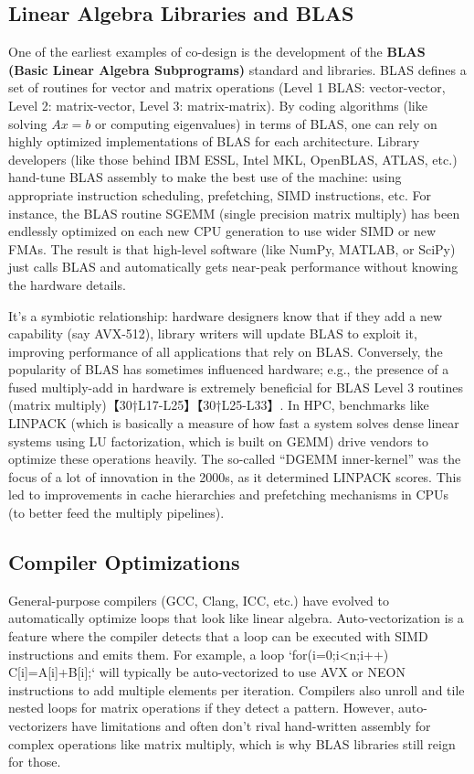 \subsection{Linear Algebra Libraries and BLAS}  
One of the earliest examples of co-design is the development of the \textbf{BLAS (Basic Linear Algebra Subprograms)} standard and libraries. BLAS defines a set of routines for vector and matrix operations (Level 1 BLAS: vector-vector, Level 2: matrix-vector, Level 3: matrix-matrix). By coding algorithms (like solving $Ax=b$ or computing eigenvalues) in terms of BLAS, one can rely on highly optimized implementations of BLAS for each architecture. Library developers (like those behind IBM ESSL, Intel MKL, OpenBLAS, ATLAS, etc.) hand-tune BLAS assembly to make the best use of the machine: using appropriate instruction scheduling, prefetching, SIMD instructions, etc. For instance, the BLAS routine SGEMM (single precision matrix multiply) has been endlessly optimized on each new CPU generation to use wider SIMD or new FMAs. The result is that high-level software (like NumPy, MATLAB, or SciPy) just calls BLAS and automatically gets near-peak performance without knowing the hardware details.

It’s a symbiotic relationship: hardware designers know that if they add a new capability (say AVX-512), library writers will update BLAS to exploit it, improving performance of all applications that rely on BLAS. Conversely, the popularity of BLAS has sometimes influenced hardware; e.g., the presence of a fused multiply-add in hardware is extremely beneficial for BLAS Level 3 routines (matrix multiply)【30†L17-L25】【30†L25-L33】. In HPC, benchmarks like LINPACK (which is basically a measure of how fast a system solves dense linear systems using LU factorization, which is built on GEMM) drive vendors to optimize these operations heavily. The so-called “DGEMM inner-kernel” was the focus of a lot of innovation in the 2000s, as it determined LINPACK scores. This led to improvements in cache hierarchies and prefetching mechanisms in CPUs (to better feed the multiply pipelines).

\subsection{Compiler Optimizations}  
General-purpose compilers (GCC, Clang, ICC, etc.) have evolved to automatically optimize loops that look like linear algebra. Auto-vectorization is a feature where the compiler detects that a loop can be executed with SIMD instructions and emits them. For example, a loop `for(i=0;i<n;i++) C[i]=A[i]+B[i];` will typically be auto-vectorized to use AVX or NEON instructions to add multiple elements per iteration. Compilers also unroll and tile nested loops for matrix operations if they detect a pattern. However, auto-vectorizers have limitations and often don’t rival hand-written assembly for complex operations like matrix multiply, which is why BLAS libraries still reign for those.

